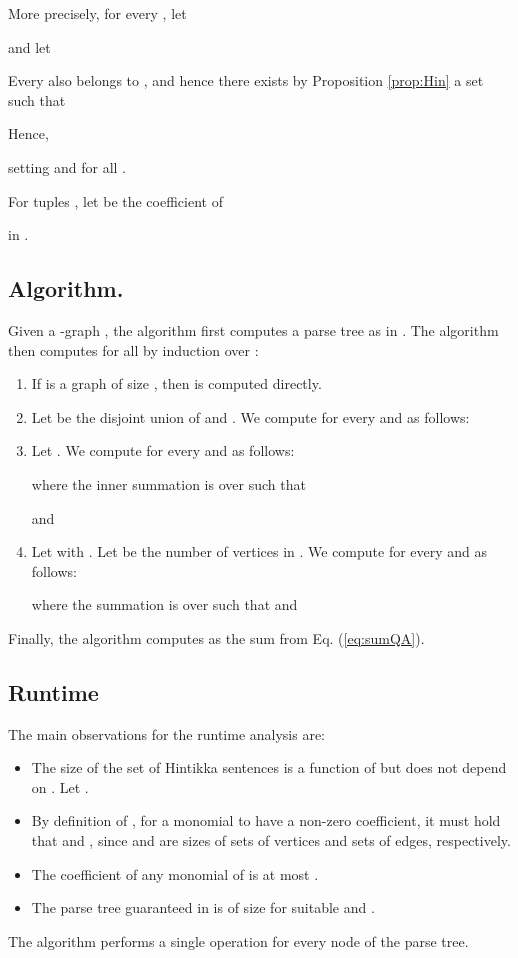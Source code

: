 \documentclass{llncs}
\begin{document}
More precisely, for every ,
let 

and let 

Every  also belongs to , and hence there
exists by Proposition \ref{prop:Hin} a set 
such that 

Hence,

 setting  and  for all .

For tuples ,
let  be the coefficient
of 

in .

\subsection*{Algorithm.}

Given a -graph , the algorithm first computes a parse tree
 as in \cite{ar:Oum2005,ar:SeymourOum2006}. The algorithm
then computes  for all 
by induction over :
\begin{enumerate}
\item If  is a graph of size , then  is computed
directly. 
\item Let  be the disjoint union of  and . We compute
 for every 
and  as follows: 

 
\item Let . We compute 
for every  and 
as follows: 

where the inner summation is over  such that 

and 


\item Let  with . Let  be the number of vertices in . 
We compute 
for every  and 
as follows: 

where the summation is over  such that  and


\end{enumerate}

Finally, the algorithm computes 
as the sum from Eq. (\ref{eq:sumQA}).
\subsection{Runtime}

The main observations for the runtime analysis are:
\begin{itemize}
\item The size of the set  of Hintikka
sentences is a function of  but does not depend on . Let . 
\item By definition of , for a monomial 
to have a non-zero coefficient, it must hold that  and
, since  and 
are sizes of sets of vertices and sets of edges, respectively.
\item The coefficient of any monomial of  is at most . 
\item The parse tree guaranteed in \cite{ar:Oum2005,ar:SeymourOum2006}
is of size  for suitable  and . 
\end{itemize}
The algorithm performs a single operation for every node of the parse
tree. 
\end{document}
